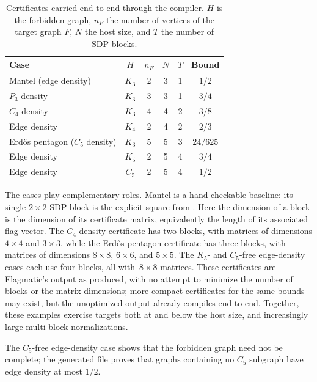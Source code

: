 \documentclass{article}
\begin{document}
\begin{table}
  \centering
\caption{Certificates carried end-to-end through the compiler.  \(H\) is the
  forbidden graph, \(n_F\) the number of vertices of the target graph \(F\),
  \(N\) the host size, and \(T\) the number of SDP blocks.}
  \label{tab:flagmatic-scenarios}
  \begin{tabular}{lccccc}
    \toprule
    Case & $H$ & $n_F$ & $N$ & $T$ & Bound \\
    \midrule
    Mantel (edge density)               & $K_3$ & 2 & 3 & 1 & $1/2$    \\
    $P_3$ density                       & $K_3$ & 3 & 3 & 1 & $3/4$    \\
    $C_4$ density                       & $K_3$ & 4 & 4 & 2 & $3/8$    \\
    Edge density                        & $K_4$ & 2 & 4 & 2 & $2/3$    \\
    Erd\H{o}s pentagon ($C_5$ density)  & $K_3$ & 5 & 5 & 3 & $24/625$ \\
    Edge density                        & $K_5$ & 2 & 5 & 4 & $3/4$    \\
    Edge density                        & $C_5$ & 2 & 5 & 4 & $1/2$    \\
    \bottomrule
  \end{tabular}
\end{table}

The cases play complementary roles.  Mantel is a hand-checkable baseline: its
single $2\times2$ SDP block is the explicit square from
.  Here the dimension of a block is the
dimension of its certificate matrix, equivalently the length of its associated
flag vector.  The $C_4$-density certificate has two blocks, with matrices of
dimensions $4\times4$ and $3\times3$, while the Erd\H{o}s pentagon certificate
has three blocks, with matrices of dimensions $8\times8$, $6\times6$, and
$5\times5$.  The $K_5$- and $C_5$-free edge-density cases each use four blocks,
all with~$8\times8$ matrices.  These certificates are Flagmatic's output as
produced, with no attempt to minimize the number of blocks or the matrix
dimensions; more compact certificates for the same bounds may exist, but the
unoptimized output already compiles end to end.  Together, these examples
exercise targets both
at and below the host size, and increasingly large multi-block normalizations.

The $C_5$-free edge-density case shows that the forbidden graph need not be
complete; the generated file proves that graphs containing no $C_5$ subgraph
have edge density at most $1/2$.
\end{document}
